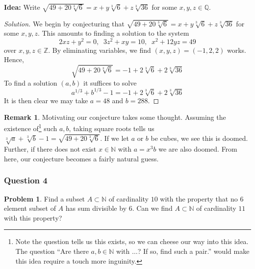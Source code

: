 \documentclass[11pt]{article}
\theoremstyle{definition}
\newtheorem*{problem}{Problem}
\newtheorem*{remark}{Remark}
\begin{document}
{\bf Idea:} Write $\sqrt{49 + 20\sqrt[3]{6}} = x + y\sqrt[3]{6} + z\sqrt[3]{36}$ for some $x, y, z \in \mathbb{Q}$.

\begin{proof}[Solution] 
  We begin by conjecturing that $\sqrt{49 + 20\sqrt[3]{6}} = x + y\sqrt[3]{6} + z\sqrt[3]{36}$ for some $x, y, z$. This 
  amounts to finding a solution to the system  
  \begin{equation*}
    2xz + y^2 = 0, \; \; 3z^2 + xy = 10, \; \; x^2 + 12yz = 49 
  \end{equation*}
  over $x, y, z \in \mathbb{Z}$. By eliminating variables, we find $(x, y, z) = (-1, 2, 2)$ works. Hence, 
  \[\sqrt{49 + 20\sqrt[3]{6}} = -1 + 2\sqrt[3]{6} + 2\sqrt[3]{36}\]
  To find a solution $(a,b)$ it suffices to solve
  \[a^{1/3} + b^{1/3} - 1 = -1 +2\sqrt[3]{6} + 2\sqrt[3]{36}\]
  It is then clear we may take $a = 48$ and $b = 288$.
\end{proof}

\begin{remark}
  Motivating our conjecture takes some thought. Assuming the existence of\footnote{
    Note the question tells us this exists, so we can cheese our way into this idea. The question ``Are there 
    $a, b \in \mathbb{N}$ with $\dots$? If so, find such a pair.'' would make this idea require a touch more inguinity.}
  such $a, b$, taking square roots tells us $\sqrt[3]{a} + \sqrt[3]{b} - 1 = \sqrt{49 + 20\sqrt[3]{6}}$. If we let 
  $a$ or $b$ be cubes, we see this is doomed. Further, if there does not exist $x \in \mathbb{N}$ with $a = x^3b$ we 
  are also doomed. From here, our conjecture becomes a fairly natural guess. 
\end{remark}


\newpage 

\subsubsection{Question 4}

\begin{problem}
  Find a subset $A \subset \mathbb{N}$ of cardinality $10$ with the property that no $6$ element subset of 
  $A$ has sum divisible by $6$. Can we find $A \subset \mathbb{N}$ of cardinality $11$ with this property? 
\end{problem}
\end{document}
